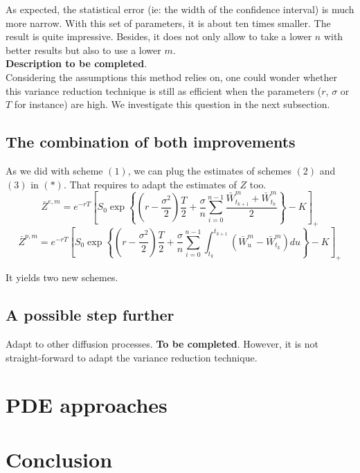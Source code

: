 \documentclass{article}
\begin{document}
As expected, the statistical error (ie: the width of the confidence interval) is much more narrow. With this set of
parameters, it is about ten times smaller. The result is quite impressive. Besides, it does not only allow to take
a lower $n$ with better results but also to use a lower $m$.\\
\textbf{Description to be completed}.\\
Considering the assumptions this method relies on, one could wonder whether this variance reduction technique
is still as efficient when the parameters ($r$, $\sigma$ or $T$ for instance) are high. We investigate this question
in the next subsection.

\subsection{The combination of both improvements}

As we did with scheme $(1)$, we can plug the estimates of schemes $(2)$ and $(3)$ in $(\ast)$. That requires
to adapt the estimates of $Z$ too.
\begin{equation}
	\bar Z^{e, m} = e^{-rT} \left[ S_0 \exp \left\{ \left( r - \frac{\sigma^2}{2} \right) \frac{T}{2} +
		\frac{\sigma}{n} \sum_{i=0}^{n-1} \frac{\bar W_{t_{k+1}}^m + \bar W_{t_k}^m}{2} \right\} - K \right]_+
	\tag{$ii$}
\end{equation}
\begin{equation}
	\bar Z^{p, m} = e^{-rT} \left[ S_0 \exp \left\{ \left( r - \frac{\sigma^2}{2} \right) \frac{T}{2} +
		\frac{\sigma}{n} \sum_{i=0}^{n-1}
		\int_{t_k}^{t_{k+1}} \left( \bar W_u^m - \bar W_{t_k}^m \right) du
		\right\} - K \right]_+
	\tag{$iii$}
\end{equation}

It yields two new schemes.

\subsection{A possible step further}

Adapt to other diffusion processes. \textbf{To be completed}. However, it is not straight-forward to adapt the
variance reduction technique.

\section{PDE approaches}

\section*{Conclusion}


{}

\end{document}
